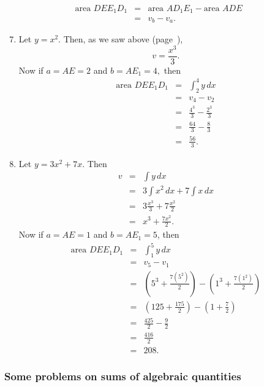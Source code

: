 \documentclass[polutonikogreek,english,twoside,openright]{article}
\newlength{\oldjot}
\begin{document}
\begin{eqnarray*}
\mbox{area }DEE_1D_1 & = & \mbox{area }AD_1E_1 - \mbox{area }ADE\\
& = & v_b - v_a.
\end{eqnarray*}
\begin{enumerate}
\setcounter{enumi}{6}

\item Let $y = x^2$. Then, as we saw above (page~\pageref{int1}), 
$$v = \frac{x^3}{3}.$$
Now if $a = AE = 2$ and $b= AE_1 = 4,$ then 
\setlength{\jot}{2ex}
\begin{eqnarray*}
\mbox{area }DEE_1D_1 & = & \int_2^4\! y\,dx\\
& = & v_4 -v_2\\
& = & \frac{4^3}{3} - \frac{2^3}{3}\\
& = & \frac{64}{3} - \frac{8}{3}\\
& = & \frac{56}{3}.
\end{eqnarray*}


\item Let $y = 3x^2 + 7x$.  Then
\begin{eqnarray*}
v & = & \int\!y\,dx\\
& = & 3\int\! x^2\,dx + 7\int\!x\,dx\\
& = & 3\frac{x^3}{3} + 7\frac{x^2}{2}\\
& = & x^3 + \frac{7x^2}{2}.
\end{eqnarray*}
Now if $a = AE = 1$ and $b = AE_1 = 5$, then
\begin{eqnarray*}
\mbox{area }DEE_1D_1 & = & \int_1^5\! y\,dx\\
& = & v_5 -v_1\\
& = & \left(5^3 + \frac{7(5^2)}{2}\right) - \left(1^3 + \frac{7(1^2)}{2}\right)\\
& = & \left(125 + \frac{175}{2}\right) - \left(1 + \frac{7}{2}\right)\\
& = & \frac{425}{2} - \frac{9}{2}\\
& = & \frac{416}{2}\\
& = & 208.
\end{eqnarray*}

\setlength{\jot}{\oldjot}


\end{enumerate}

\subsubsection*{Some problems on sums of algebraic quantities}
\end{document}
